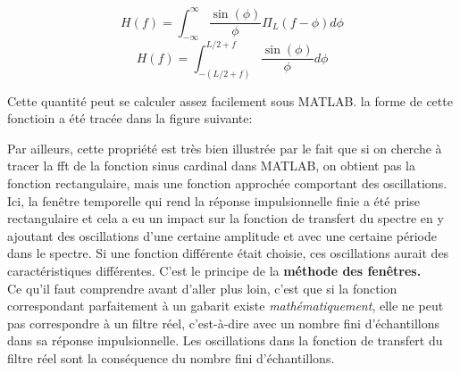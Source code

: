 \documentclass[11pt,a4paper]{article}
\begin{document}
\[ H(f) =  \int^{\infty}_{-\infty} \frac{\sin(\phi)}{\phi } \Pi_L(f- \phi) d \phi \]
\[ H(f) =  \int^{L/2+f}_{-(L/2+ f)} \frac{\sin(\phi)}{\phi }  d \phi \]

Cette quantité peut se calculer assez facilement sous MATLAB. la forme de cette fonctioin a été tracée dans la figure suivante:\\ %


\usetikzlibrary {datavisualization}

%


Par ailleurs, cette propriété est très bien illustrée par le fait que si on cherche à tracer la fft de la fonction sinus cardinal dans MATLAB, on obtient pas la fonction rectangulaire, mais une fonction approchée comportant des oscillations.\\

Ici, la fenêtre temporelle qui rend la réponse impulsionnelle finie a été prise rectangulaire et cela a eu un impact sur la fonction de transfert du spectre en y ajoutant des oscillations d'une certaine amplitude et avec une certaine période dans le spectre. Si une fonction différente était choisie, ces oscillations aurait des caractéristiques différentes. C'est le principe de la \textbf{méthode des fenêtres.}\\

Ce qu'il faut comprendre avant d'aller plus loin, c'est que si la fonction correspondant parfaitement à un gabarit existe \textit{mathématiquement}, elle ne peut pas correspondre à un filtre réel, c'est-à-dire avec un nombre fini d'échantillons dans sa réponse impulsionnelle. Les oscillations dans la fonction de transfert du filtre réel sont la conséquence du nombre fini d'échantillons.\\
\end{document}
